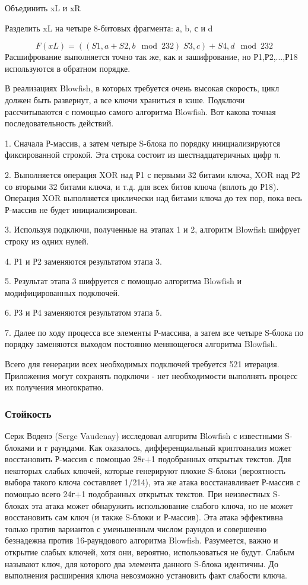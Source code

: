 	Объединить xL и xR
	
	Разделить xL на четыре 8-битовых фрагмента: а, b, с и d 

	$$F(xL) = ((S1,a + S2,b\mod232)   S3,c) + S4,d\mod232                                           $$
Расшифрование выполняется точно так же, как и зашифрование,  но Р1,Р2,...,Р18 используются в обратном порядке.

	В реализациях Blowfish, в которых требуется очень высокая скорость, цикл должен быть развернут, а все ключи храниться в кэше.
	Подключи рассчитываются с помощью самого алгоритма Blowfish. Вот какова точная последовательность действий.

1. Сначала Р-массив, а затем четыре S-блока по порядку инициализируются фиксированной строкой. Эта строка состоит из шестнадцатеричных цифр π.

2. Выполняется операция XOR над Р1 с первыми 32 битами ключа, XOR над Р2 со вторыми 32 битами ключа, и т.д. для всех битов ключа (вплоть до Р18). Операция XOR выполняется циклически над битами ключа до тех пор, пока весь Р-массив не будет инициализирован.

3. Используя подключи, полученные на этапах 1 и 2, алгоритм Blowfish шифрует строку из одних нулей.

4. Р1 и Р2 заменяются результатом этапа 3.

5. Результат этапа 3 шифруется с помощью алгоритма Blowfish и модифицированных подключей.

6. Р3 и Р4 заменяются результатом этапа 5.

7. Далее по ходу процесса все элементы Р-массива, а затем все четыре S-блока по порядку заменяются выходом постоянно меняющегося алгоритма Blowfish.

	Всего для генерации всех необходимых подключей требуется 521 итерация. Приложения могут сохранять подключи - нет необходимости выполнять процесс их получения многократно.

\subsubsection{Стойкость}

Серж Воденэ (Serge Vaudenay) исследовал алгоритм Blowfish с известными S-блоками и r раундами. Как оказалось, дифференциальный криптоанализ может восстановить Р-массив с помощью 28r+1 подобранных открытых текстов. Для некоторых слабых ключей, которые генерируют плохие S-блоки (вероятность выбора такого ключа составляет 1/214), эта же атака восстанавливает Р-массив с помощью всего 24г+1 подобранных открытых текстов. При неизвестных S-блоках эта атака может обнаружить использование слабого ключа, но не может восстановить сам ключ (и также S-блоки и Р-массив). Эта атака эффективна только против вариантов с уменьшенным числом раундов и совершенно безнадежна против 16-раундового алгоритма Blowfish. Разумеется, важно и открытие слабых ключей, хотя они, вероятно, использоваться не будут. Слабым называют ключ, для которого два элемента данного S-блока идентичны. До выполнения расширения ключа невозможно установить факт слабости ключа. 

